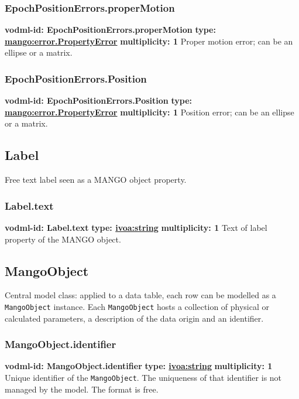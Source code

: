     \subsubsection{EpochPositionErrors.properMotion}
      \textbf{vodml-id: EpochPositionErrors.properMotion} \newline
      \textbf{type: \hyperref[sect:error.PropertyError]{mango:error.PropertyError}} \newline
      \textbf{multiplicity: 1} \newline
      Proper motion error; can be an ellipse or a matrix.

    \subsubsection{EpochPositionErrors.Position}
      \textbf{vodml-id: EpochPositionErrors.Position} \newline
      \textbf{type: \hyperref[sect:error.PropertyError]{mango:error.PropertyError}} \newline
      \textbf{multiplicity: 1} \newline
      Position error; can be an ellipse or a matrix.

  \subsection{Label}
  \label{sect:Label}
    Free text label seen as a MANGO object property.

    \subsubsection{Label.text}
      \textbf{vodml-id: Label.text} \newline
      \textbf{type: \hyperref[sect:ivoa]{ivoa:string}} \newline
      \textbf{multiplicity: 1} \newline
      Text of label property of the MANGO object.

  \subsection{MangoObject}
  \label{sect:MangoObject}
    Central model class: applied to a data table, each row can be modelled as a \texttt{MangoObject} instance. Each \texttt{MangoObject} hosts a collection of physical or calculated parameters, a description of the data origin and an identifier.

    \subsubsection{MangoObject.identifier}
      \textbf{vodml-id: MangoObject.identifier} \newline
      \textbf{type: \hyperref[sect:ivoa]{ivoa:string}} \newline
      \textbf{multiplicity: 1} \newline
      Unique identifier of the \texttt{MangoObject}. The uniqueness of that identifier is not managed by the model. The format is free.


